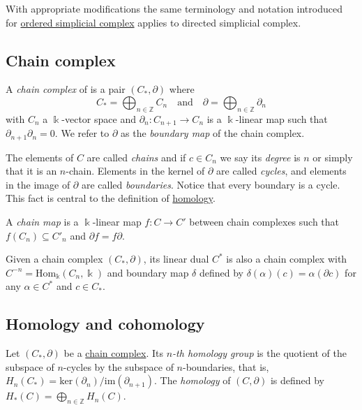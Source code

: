 \documentclass{amsart}
\begin{document}
	With appropriate modifications the same terminology and notation introduced for \hyperref[ordered simplicial complex]{ordered simplicial complex} applies to directed simplicial complex.
	
	\subsection*{Chain complex} \label{chain complex}
	
	A \textit{chain complex} of is a pair $(C_*, \partial)$ where
	\begin{equation*}
	C_* = \bigoplus_{n \in \mathbb Z} C_n \quad \mathrm{and} \quad \partial = \bigoplus_{n \in \mathbb Z} \partial_n
	\end{equation*}
	with $C_n$ a $\Bbbk$-vector space and $\partial_n : C_{n+1} \to C_n$ is a $\Bbbk$-linear map such that $\partial_{n+1} \partial_n = 0$. We refer to $\partial$ as the \textit{boundary map} of the chain complex.
	
	The elements of $C$ are called \textit{chains} and if $c \in C_n$ we say its \textit{degree} is $n$ or simply that it is an $n$-chain. Elements in the kernel of $\partial$ are called \textit{cycles}, and elements in the image of $\partial$ are called \textit{boundaries}. Notice that every boundary is a cycle. This fact is central to the definition of \hyperref[homology]{homology}.
	
	A \textit{chain map} is a $\Bbbk$-linear map $f : C \to C'$ between chain complexes such that $f(C_n) \subseteq C'_n$ and $\partial f = f \partial$.
	
	Given a chain complex $(C_*, \partial)$, its linear dual $C^*$ is also a chain complex with $C^{-n} = \mathrm{Hom_\Bbbk}(C_n, \Bbbk)$ and boundary map $\delta$ defined by $\delta(\alpha)(c) = \alpha(\partial c)$ for any $\alpha \in C^*$ and $c \in C_*$.
	
	\subsection*{Homology and cohomology} \label{homology and cohomology}
	
	Let $(C_*, \partial)$ be a \hyperref[chain complex]{chain complex}. Its \textit{$n$-th homology group} is the quotient of the subspace of $n$-cycles by the subspace of $n$-boundaries, that is, $H_n(C_*) = \mathrm{ker}(\partial_n)/ \mathrm{im}(\partial_{n+1})$. The \textit{homology} of $(C, \partial)$ is defined by $H_*(C) = \bigoplus_{n \in \mathbb Z} H_n(C)$.
	
\end{document}
